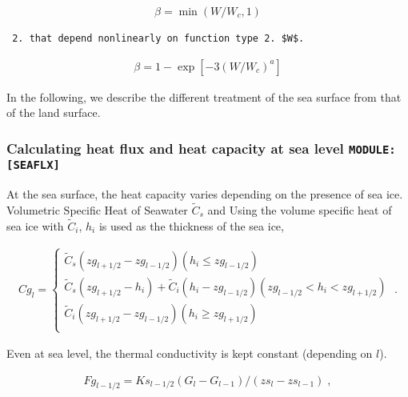 \begin{eqnarray}
          \beta = \min \left( W/W_c, 1 \right)
\end{eqnarray}

\begin{verbatim}
 2. that depend nonlinearly on function type 2. $W$.
\end{verbatim}

\begin{eqnarray}
          \beta = 1-\exp \left[-3(W/W_c)^{a} \right]
\end{eqnarray}

In the following, we describe the different treatment of the sea surface
from that of the land surface.

\hypertarget{calculating-heat-flux-and-heat-capacity-at-sea-level-moduleseaflx}{%
\subsubsection{\texorpdfstring{Calculating heat flux and heat capacity
at sea level
\texttt{MODULE:{[}SEAFLX{]}}}{Calculating heat flux and heat capacity at sea level MODULE:{[}SEAFLX{]}}}\label{calculating-heat-flux-and-heat-capacity-at-sea-level-moduleseaflx}}

At the sea surface, the heat capacity varies depending on the presence
of sea ice. Volumetric Specific Heat of Seawater \(\tilde{C}_s\) and
Using the volume specific heat of sea ice with \(\tilde{C}_i\), \(h_i\)
is used as the thickness of the sea ice,

\begin{eqnarray}
  Cg_{l}  = \left\{ 
    \begin{array}{ll}
      \tilde{C}_s (zg_{l+1/2} - zg_{l-1/2})
               ( h_i \le zg_{l-1/2} )\\
      \tilde{C}_s (zg_{l+1/2} - h_i)
    + \tilde{C}_i ( h_i - zg_{l-1/2} )
               ( zg_{l-1/2} < h_i < zg_{l+1/2} )\\
      \tilde{C}_i (zg_{l+1/2} - zg_{l-1/2})
               ( h_i \ge zg_{l+1/2} ) \\
    \end{array} 
    \right. \; .
\end{eqnarray}

Even at sea level, the thermal conductivity is kept constant (depending
on \(l\)).

\begin{eqnarray}
  Fg_{l-1/2} = Ks_{l-1/2} (G_l - G_{l-1})/(zs_l - zs_{l-1}) \; ,
\end{eqnarray}

